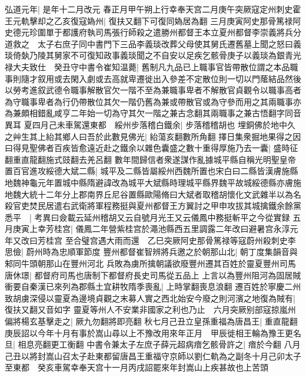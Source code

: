 弘道元年|{
	是年十二月改元}
春正月甲午朔上行幸奉天宫二月庚午突厥寇定州刺史霍王元軌擊却之乙亥復寇媯州|{
	復扶又翻下可復同媯居為翻}
三月庚寅阿史那骨篤禄阿史德元珍圍單于都護府執司馬張行師殺之遣勝州都督王本立夏州都督李崇義將兵分道救之　太子右庶子同中書門下三品李義琰改葬父母使其舅氏遷舊墓上聞之怒曰義琰倚埶乃陵其舅家不可復知政事義琰聞之不自安以足疾乞骸骨庚子以義琰為銀青光禄大夫致仕　癸丑守中書令崔知温薨|{
	舊制凡九品已上職事官皆帶散位謂之本品職事則隨才叙用或去閑入劇或去高就卑遷徙出入參差不定散位則一切以門䕃結品然後以勞考進叙武德令職事解散官欠一階不至為兼職事卑者不解散官貞觀令以職事高者為守職事卑者為行仍帶散位其欠一階仍舊為兼或帶散官或為守參而用之其兩職事亦為兼頗相錯亂咸亨二年始一切為守其欠一階之兼古念翻其兩職事之兼古悟翻字同音異耳}
夏四月己未車駕還東都　綏州步落稽白鐵余|{
	步落稽稽胡也}
埋銅佛於地中久之艸生其上紿其鄉人曰吾於此數見佛光|{
	紿蕩亥翻數所角翻}
擇日集衆掘地果得之因曰得見聖佛者百疾皆愈遠近赴之鐵余以雜色囊盛之數十重得厚施乃去一囊|{
	盛時征翻重直龍翻施式豉翻去羌呂翻}
數年間歸信者衆遂謀作亂據城平縣自稱光明聖皇帝置百官進攻綏德大斌二縣|{
	城平及二縣皆屬綏州西魏所置也宋白曰二縣皆漢膚施縣地魏神龜元年置城中縣隋避諱改為城平大斌縣時理城平縣界魏平故城綏德縣亦膚施地魏大統十二年分上郡南界丘尼谷置縣歐陽脩曰大斌者取稽胡懷化文武雜半以為名}
殺官吏焚民居遣右武衛將軍程務挺與夏州都督王方翼討之甲申攻拔其城擒鐵余餘黨悉平　|{
	考異曰僉載云延州稽胡又云自號月光王又云儀鳳中務挺斬平之今從實録}
五月庚寅上幸芳桂宫|{
	儀鳳二年營紫桂宫於澠池縣西五里調露二年改曰避暑宫永淳元年又改曰芳桂宫}
至合璧宫遇大雨而還　乙巳突厥阿史那骨篤禄等寇蔚州殺刺史李思儉|{
	蔚州時為忠順軍節度}
豐州都督崔智辨將兵邀之於朝那山北|{
	朝丁度集韻音與邾同牛頭朝那山在豐州河北}
兵敗為虜所擒朝議欲廢豐州遷其百姓於靈夏豐州司馬唐休璟|{
	都督府司馬也唐制下都督府長史司馬從五品上}
上言以為豐州阻河為固居賊衝要自秦漢已來列為郡縣土宜耕牧隋季喪亂|{
	上時掌翻喪息浪翻}
遷百姓於寧慶二州致胡虜深侵以靈夏為邊境貞觀之末募人實之西北始安今廢之則河濱之地復為賊有|{
	復扶又翻又音如字}
靈夏等州人不安業非國家之利也乃止　六月突厥别部寇掠嵐州偏將楊玄基擊走之|{
	厥九勿翻將即亮翻}
秋七月己丑立皇孫重福為唐昌王|{
	重直龍翻}
庚辰詔以今年十月有事於嵩山尋以上不豫改用來年正月　甲辰徙相王輪為豫王更名旦|{
	相息亮翻更工衡翻}
中書令兼太子左庶子薛元超病瘖乞骸骨許之|{
	瘖於今翻}
八月己丑以將封嵩山召太子赴東都留唐昌王重福守京師以劉仁軌為之副冬十月己卯太子至東都　癸亥車駕幸奉天宫十一月丙戌詔罷來年封嵩山上疾甚故也上苦頭

